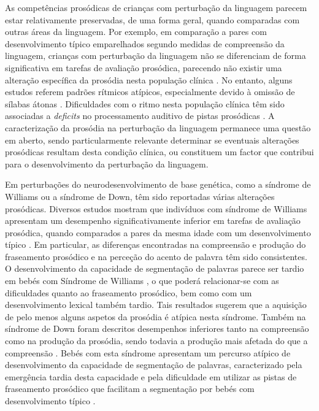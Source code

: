 \documentclass[output=paper,colorlinks,citecolor=brown,booklanguage=portuguese]{langscibook}
\begin{document}
As competências prosódicas de crianças com perturbação da linguagem parecem estar relativamente preservadas, de uma forma geral, quando comparadas com outras áreas da linguagem. Por exemplo, em comparação a pares com desenvolvimento típico emparelhados segundo medidas de compreensão da linguagem, crianças com perturbação da linguagem não se diferenciam de forma significativa em tarefas de avaliação prosódica, parecendo não existir uma alteração específica da prosódia nesta população clínica \citep{Wells2003}. No entanto, alguns estudos referem padrões rítmicos atípicos, especialmente devido à omissão de sílabas átonas \citep{McGregor1994}. Dificuldades com o ritmo nesta população clínica têm sido associadas a \emph{deficits} no processamento auditivo de pistas prosódicas \citep{Corriveau2007}. A caracterização da prosódia na perturbação da linguagem permanece uma questão em aberto, sendo particularmente relevante determinar se eventuais alterações prosódicas resultam desta condição clínica, ou constituem um factor que contribui para o desenvolvimento da perturbação da linguagem.

Em perturbações do neurodesenvolvimento de base genética, como a síndrome de Williams ou a síndrome de Down, têm sido reportadas várias alterações prosódicas. Diversos estudos mostram que indivíduos com síndrome de Williams apresentam um desempenho significativamente inferior em tarefas de avaliação prosódica, quando comparados a pares da mesma idade com um desenvolvimento típico \citep{PlesaSkwerer2007, Stojanovik2007, MartinezCastilla2011}. Em particular, as diferenças encontradas na compreensão e produção do fraseamento prosódico e na perceção do acento de palavra têm sido consistentes. O desenvolvimento da capacidade de segmentação de palavras parece ser tardio em bebés com Síndrome de Williams \citep{Nazzi2003}, o que poderá relacio\-nar-se com as dificuldades quanto ao fraseamento prosódico, bem como com um desenvolvimento lexical também tardio. Tais resultados sugerem que a aquisição de pelo menos alguns aspetos da prosódia é atípica nesta síndrome. Também na síndrome de Down foram descritos desempenhos inferiores tanto na compreensão como na produção da prosódia, sendo todavia a produção mais afetada do que a compreensão \citep{Stojanovik2011, Kent2013}. Bebés com esta síndrome apresentam um percurso atípico de desenvolvimento da capacidade de segmentação de palavras, caracterizado pela emergência tardia desta capacidade \citep{MasonApps2011, MasonApps2018} e pela dificuldade em utilizar as pistas de fraseamento prosódico que facilitam a segmentação por bebés com desenvolvimento típico \citep{Frota2020a}. 
\end{document}
